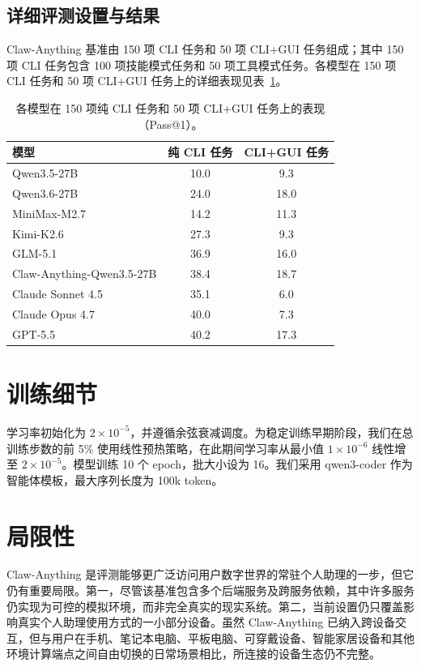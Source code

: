 \documentclass[10pt]{article}
\begin{document}
\subsection{详细评测设置与结果}

Claw-Anything 基准由 150 项 CLI 任务和 50 项 CLI+GUI 任务组成；其中 150 项 CLI 任务包含 100 项技能模式任务和 50 项工具模式任务。各模型在 150 项 CLI 任务和 50 项 CLI+GUI 任务上的详细表现见表~\ref{tab:guiper}。

\begin{table}[t]
  \centering
  \caption{各模型在 150 项纯 CLI 任务和 50 项 CLI+GUI 任务上的表现（Pass@1）。}
  \label{tab:guiper}
  \begin{tabular}{lcc}
    \toprule
    模型 & 纯 CLI 任务 & CLI+GUI 任务 \\
    \midrule
    Qwen3.5-27B               & 10.0 & 9.3 \\
    Qwen3.6-27B               & 24.0 & 18.0 \\
    MiniMax-M2.7              & 14.2 & 11.3 \\
    Kimi-K2.6                 & 27.3 & 9.3 \\
    GLM-5.1                   & 36.9 & 16.0 \\
    Claw-Anything-Qwen3.5-27B & 38.4 & 18.7 \\
    Claude Sonnet 4.5         & 35.1 & 6.0 \\
    Claude Opus 4.7           & 40.0 & 7.3 \\
    GPT-5.5                   & 40.2 & 17.3 \\
    \bottomrule
  \end{tabular}
\end{table}

\section{训练细节}

学习率初始化为 $2\times10^{-5}$，并遵循余弦衰减调度。为稳定训练早期阶段，我们在总训练步数的前 5\% 使用线性预热策略，在此期间学习率从最小值 $1\times10^{-6}$ 线性增至 $2\times10^{-5}$。模型训练 10 个 epoch，批大小设为 16。我们采用 qwen3-coder 作为智能体模板，最大序列长度为 100k token。

\section{局限性}
\label{sec:limitations}

Claw-Anything 是评测能够更广泛访问用户数字世界的常驻个人助理的一步，但它仍有重要局限。第一，尽管该基准包含多个后端服务及跨服务依赖，其中许多服务仍实现为可控的模拟环境，而非完全真实的现实系统。第二，当前设置仍只覆盖影响真实个人助理使用方式的一小部分设备。虽然 Claw-Anything 已纳入跨设备交互，但与用户在手机、笔记本电脑、平板电脑、可穿戴设备、智能家居设备和其他环境计算端点之间自由切换的日常场景相比，所连接的设备生态仍不完整。
\end{document}
